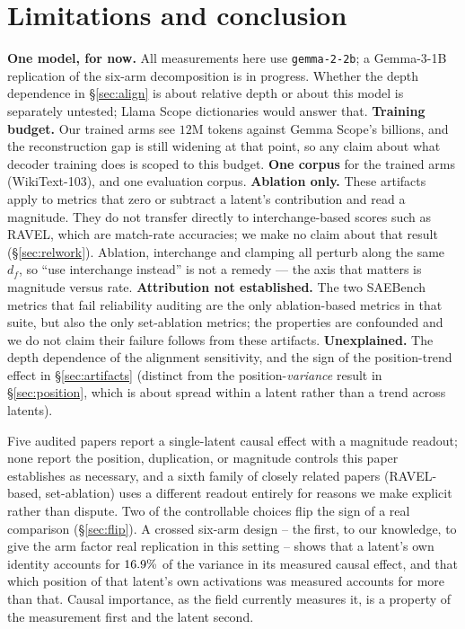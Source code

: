 \documentclass[11pt]{article}
\begin{document}
\section{Limitations and conclusion}
\label{sec:limitations}
\textbf{One model, for now.} All measurements here use \texttt{gemma-2-2b}; a
Gemma-3-1B replication of the six-arm decomposition is in progress. Whether the
depth dependence in \S\ref{sec:align} is about relative depth or about this
model is separately untested; Llama Scope dictionaries would answer that.
\textbf{Training budget.} Our trained arms see $12$M tokens against Gemma
Scope's billions, and the reconstruction gap is still widening at that point,
so any claim about what decoder training does is scoped to this budget.
\textbf{One corpus} for the trained arms (WikiText-103), and one evaluation
corpus. \textbf{Ablation only.} These artifacts apply to metrics that zero or
subtract a latent's contribution and read a magnitude. They do not transfer
directly to interchange-based scores such as RAVEL, which are match-rate
accuracies; we make no claim about that result (\S\ref{sec:relwork}). Ablation, interchange and
clamping all perturb along the same $d_f$, so ``use interchange instead'' is
not a remedy --- the axis that matters is magnitude versus rate.
\textbf{Attribution not established.} The two SAEBench metrics that fail
reliability auditing are the only ablation-based metrics in that suite, but also
the only set-ablation metrics; the properties are confounded and we do not claim
their failure follows from these artifacts. \textbf{Unexplained.} The depth
dependence of the alignment sensitivity, and the sign of the position-trend
effect in \S\ref{sec:artifacts} (distinct from the position-\emph{variance}
result in \S\ref{sec:position}, which is about spread within a latent rather
than a trend across latents).

Five audited papers report a single-latent causal effect with a magnitude
readout; none report the position, duplication, or magnitude controls this
paper establishes as necessary, and a sixth family of closely related papers
(RAVEL-based, set-ablation) uses a different readout entirely for reasons we
make explicit rather than dispute. Two of the controllable choices flip the
sign of a real comparison (\S\ref{sec:flip}). A crossed six-arm design --
the first, to our knowledge, to give the arm factor real replication in this
setting -- shows that a latent's own identity accounts for
$16.9\%$ of the variance in its measured causal effect, and that
which position of that latent's own activations was measured accounts for
more than that. Causal importance, as the field currently measures it, is a
property of the measurement first and the latent second.
\end{document}
